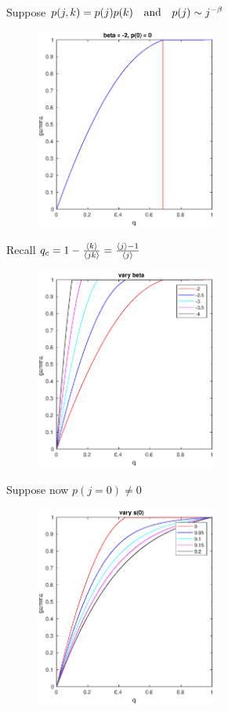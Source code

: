 \documentclass[10pt]{beamer}
\begin{document}
\begin{frame}
Suppose $p(j,k) = p(j)p(k) \qand p(j) \sim j^{-\beta}$

\begin{figure}[b]
\centering
\includegraphics[height=2.6in]{beta2.eps}
\end{figure}
\end{frame}


\begin{frame}
Recall $q_c = 1 - \frac{\expval{k}}{\expval{jk}} = \frac{\expval{j} - 1}{\expval{j}}$

\begin{figure}[b]
\centering
\includegraphics[height=2.6in]{beta_vary.eps}
\end{figure}
\end{frame}

\begin{frame}
Suppose now $p(j =0) \neq 0$
\begin{figure}[b]
\centering
\includegraphics[height=2.6in]{s0_vary.eps}
\end{figure}
\end{frame}
\end{document}
